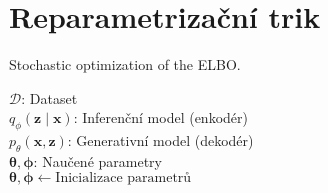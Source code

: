 \section{Reparametrizační trik}

\begin{algorithm}[hbt!]
    \caption{Stochastic optimization of the ELBO.}\label{alg:reparam_trick}
        \KwData{}
                \hspace{6mm}$\mathcal{D}$: Dataset\\
                \hspace{6mm}$q_\phi(\textbf{z}\mid\textbf{x})$: Inferenční model (enkodér)\\
                \hspace{6mm}$p_\theta(\textbf{x}, \textbf{z})$: Generativní model (dekodér)\\
        \KwResult{}
        \hspace{6mm}$\boldsymbol{\theta}, \boldsymbol{\phi}$: Naučené parametry\\

        $\boldsymbol{\theta}, \boldsymbol{\phi} \gets \text{Inicializace parametrů}$

\end{algorithm}